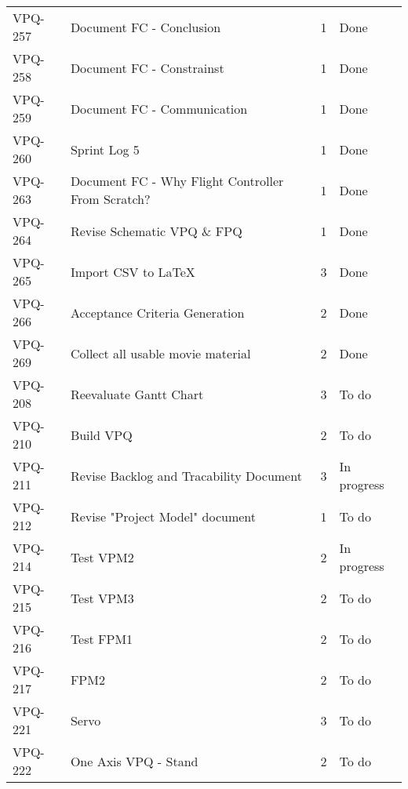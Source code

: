 \begin{table}[ht]
\begin{tabularx}{\linewidth}{|m{1.5cm} m{8.3cm} m{1.5cm} m{3.5cm}|}
\rowcolor{gainsboro} VPQ-257 & Document FC - Conclusion & 1\centering & Done  \\    
      VPQ-258 & Document FC - Constrainst & 1\centering & Done  \\
\rowcolor{gainsboro}  VPQ-259 & Document FC - Communication & 1\centering & Done  \\
      VPQ-260 & Sprint Log 5 & 1\centering & Done  \\
\rowcolor{gainsboro} VPQ-263 & Document FC - Why Flight Controller From Scratch? & 1\centering & Done  \\    
      VPQ-264 & Revise Schematic VPQ \& FPQ & 1\centering & Done  \\
\rowcolor{gainsboro}  VPQ-265 & Import CSV to LaTeX & 3\centering & Done  \\
      VPQ-266 & Acceptance Criteria Generation & 2\centering & Done  \\
\rowcolor{gainsboro} VPQ-269 & Collect all usable movie material & 2\centering & Done  \\    
      VPQ-208 & Reevaluate Gantt Chart & 3\centering & To do  \\
\rowcolor{gainsboro}  VPQ-210 &  Build VPQ & 2\centering & To do  \\
      VPQ-211 & Revise Backlog and Tracability Document & 3\centering & In progress  \\
\rowcolor{gainsboro} VPQ-212 & Revise "Project Model" document & 1\centering & To do  \\    
      VPQ-214 & Test VPM2 & 2\centering & In progress  \\
\rowcolor{gainsboro}  VPQ-215 & Test VPM3 & 2\centering & To do  \\
      VPQ-216 & Test FPM1 & 2\centering & To do  \\
\rowcolor{gainsboro} VPQ-217 & FPM2 & 2\centering & To do  \\    
      VPQ-221 & Servo & 3\centering & To do  \\
\rowcolor{gainsboro}  VPQ-222 &  One Axis VPQ - Stand & 2\centering & To do  \\

\hline    
\end{tabularx}
\end{table}


